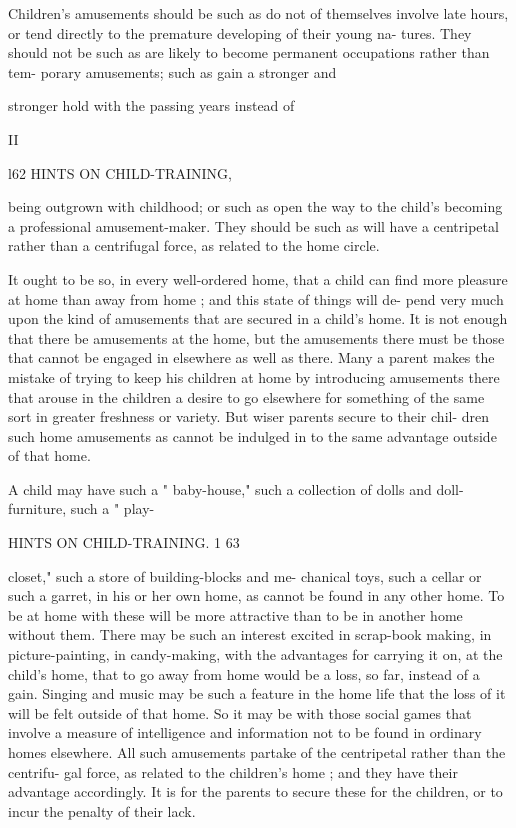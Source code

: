 \documentclass[
]{book}
\begin{document}
Children's amusements should be such as do not of themselves involve late hours, or tend directly to the premature developing of their young na- tures. They should not be such as are likely to become permanent occupations rather than tem- porary amusements; such as gain a stronger and

stronger hold with the passing years instead of

II

l62 HINTS ON CHILD-TRAINING,

being outgrown with childhood; or such as open the way to the child's becoming a professional amusement-maker. They should be such as will have a centripetal rather than a centrifugal force, as related to the home circle.

It ought to be so, in every well-ordered home, that a child can find more pleasure at home than away from home ; and this state of things will de- pend very much upon the kind of amusements that are secured in a child's home. It is not enough that there be amusements at the home, but the amusements there must be those that cannot be engaged in elsewhere as well as there. Many a parent makes the mistake of trying to keep his children at home by introducing amusements there that arouse in the children a desire to go elsewhere for something of the same sort in greater freshness or variety. But wiser parents secure to their chil- dren such home amusements as cannot be indulged in to the same advantage outside of that home.

A child may have such a " baby-house," such a collection of dolls and doll-furniture, such a " play-

HINTS ON CHILD-TRAINING. 1 63

closet," such a store of building-blocks and me- chanical toys, such a cellar or such a garret, in his or her own home, as cannot be found in any other home. To be at home with these will be more attractive than to be in another home without them. There may be such an interest excited in scrap-book making, in picture-painting, in candy-making, with the advantages for carrying it on, at the child's home, that to go away from home would be a loss, so far, instead of a gain. Singing and music may be such a feature in the home life that the loss of it will be felt outside of that home. So it may be with those social games that involve a measure of intelligence and information not to be found in ordinary homes elsewhere. All such amusements partake of the centripetal rather than the centrifu- gal force, as related to the children's home ; and they have their advantage accordingly. It is for the parents to secure these for the children, or to incur the penalty of their lack.
\end{document}
